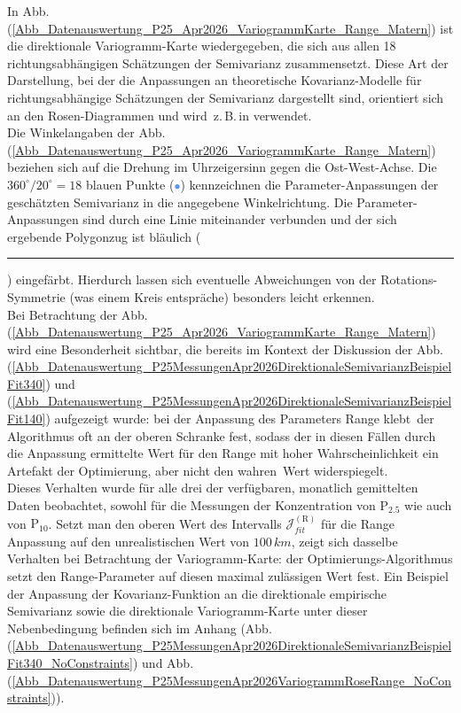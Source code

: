 In Abb.\,(\ref{Abb_Datenauswertung_P25_Apr2026_VariogrammKarte_Range_Matern}) 
ist die direktionale Variogramm-Karte wiedergegeben, die 
sich aus allen 18 richtungsabhängigen Schätzungen der Semivarianz zusammensetzt.
Diese Art der Darstellung, bei der die 
Anpassungen an theoretische Kovarianz-Modelle für
richtungsabhängige Schätzungen der Semivarianz dargestellt
sind, orientiert sich an den Rosen-Diagrammen und wird 
\,z.\,B.\,in \cite[Kap.\,8.1]{Agterberg2014} verwendet.\\
Die Winkelangaben der 
Abb.\,(\ref{Abb_Datenauswertung_P25_Apr2026_VariogrammKarte_Range_Matern}) 
beziehen sich auf die Drehung im Uhrzeigersinn
gegen die Ost-West-Achse. Die $360^\circ / 20^\circ=18$ blauen
Punkte (\textcolor{CornflowerBlue}{$\bullet$}) kennzeichnen 
die Parame\-ter-Anpassungen der geschätzten Semivarianz in die 
angegebene Winkelrichtung. Die Parameter-Anpassungen sind durch
eine Linie miteinander verbunden und der sich ergebende
Polygonzug ist bläulich 
(\textcolor{CornflowerBlue}{\rule[-0.3mm]{3mm}{3mm}}) 
eingefärbt. Hierdurch lassen sich eventuelle
Abweichungen von der Rotations-Symmetrie 
(was einem Kreis entspräche) besonders leicht 
erkennen. \\
Bei Betrachtung der 
Abb.\,(\ref{Abb_Datenauswertung_P25_Apr2026_VariogrammKarte_Range_Matern})
wird eine Besonderheit sichtbar, die bereits im Kontext 
der Diskussion der 
Abb.\,(\ref{Abb_Datenauswertung_P25MessungenApr2026DirektionaleSemivarianzBeispielFit340}) 
und 
(\ref{Abb_Datenauswertung_P25MessungenApr2026DirektionaleSemivarianzBeispielFit140})
aufgezeigt wurde: bei der Anpassung des Parameters Range 
\glqq klebt\grqq\ der Algorithmus oft an der oberen Schranke fest, 
sodass der in diesen Fällen durch die Anpassung ermittelte Wert für
 den Range mit hoher Wahrscheinlichkeit ein Artefakt 
der Optimierung, aber nicht den \glqq wahren\grqq\ Wert widerspiegelt.\\

Dieses Verhalten wurde für alle drei der verfügbaren, 
monatlich gemittelten Daten beobachtet, sowohl für die Messungen der
Konzentration von $\mathrm{P}_{2.5}$ wie auch von 
$\mathrm{P}_{10}$. Setzt man den oberen Wert des Intervalls 
$\mathcal{J}^{\mathrm{(R)}}_{fit}$ für die Range Anpassung 
auf den unrealistischen Wert von $100\,km$, zeigt sich dasselbe
Verhalten bei Betrachtung der Variogramm-Karte: der 
Optimierungs-Algorithmus setzt den Range-Parameter 
auf diesen maximal zulässigen Wert fest. 
Ein Beispiel der Anpassung der Kovarianz-Funktion an die
direktionale empirische Semivarianz sowie die direktionale
Variogramm-Karte unter dieser Nebenbedingung  
befinden sich im Anhang 
(Abb.\,(\ref{Abb_Datenauswertung_P25MessungenApr2026DirektionaleSemivarianzBeispielFit340_NoConstraints})
und
Abb.\,(\ref{Abb_Datenauswertung_P25MessungenApr2026VariogrammRoseRange_NoConstraints})). 

